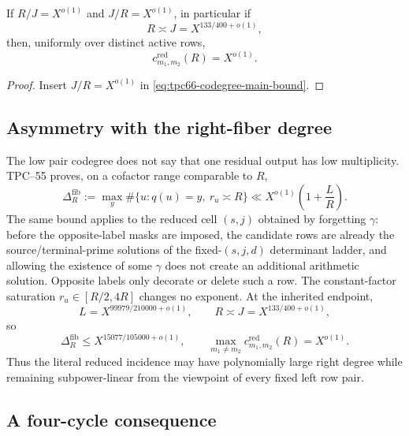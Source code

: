\begin{corollary}
\label{cor:tpc66-critical-pair-linearity}
If \(R/J=X^{o(1)}\) and \(J/R=X^{o(1)}\), in particular if
\[
 R\asymp J=X^{133/400+o(1)},
 \]
then, uniformly over distinct active rows,
\begin{equation}
 \boxed{
 c^{\mathrm{red}}_{m_1,m_2}(R)=X^{o(1)}.}
 \label{eq:tpc66-critical-subpower-codegree}
\end{equation}
\end{corollary}

\begin{proof}
Insert \(J/R=X^{o(1)}\) in
\eqref{eq:tpc66-codegree-main-bound}.
\end{proof}

\subsection{Asymmetry with the right-fiber degree}

The low pair codegree does not say that one residual output has low
multiplicity.  TPC--55 proves, on a cofactor range comparable to \(R\),
\begin{equation}
 \Delta_R^{\mathrm{fib}}
 :=
 \max_y
 \#\{u:q(u)=y,\ r_u\asymp R\}
 \ll
 X^{o(1)}
 \left(1+\frac LR\right).
 \label{eq:tpc66-right-fiber-degree}
\end{equation}
The same bound applies to the reduced cell \((s,j)\) obtained by
forgetting \(\gamma\): before the opposite-label masks are imposed, the
candidate rows are already the source/terminal-prime solutions of the
fixed-\((s,j,d)\) determinant ladder, and allowing the existence of some
\(\gamma\) does not create an additional arithmetic solution.  Opposite
labels only decorate or delete such a row.
The constant-factor saturation \(r_u\in[R/2,4R]\) changes no exponent.
At the inherited endpoint,
\[
 L=X^{99979/210000+o(1)},
 \qquad
 R\asymp J=X^{133/400+o(1)},
 \]
so
\begin{equation}
 \Delta_R^{\mathrm{fib}}
 \le
 X^{15077/105000+o(1)},
 \qquad
 \max_{m_1\ne m_2}
 c^{\mathrm{red}}_{m_1,m_2}(R)
 =X^{o(1)}.
 \label{eq:tpc66-degree-codegree-asymmetry}
\end{equation}
Thus the literal reduced incidence may have polynomially large right
degree while remaining subpower-linear from the viewpoint of every fixed
left row pair.

\subsection{A four-cycle consequence}

